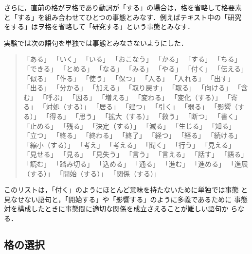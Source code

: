 \documentclass[japanese]{jnlp_1.4}
\begin{document}
さらに，直前の格がヲ格であり動詞が「する」の場合は，格を省略して格要素
と「する」を組み合わせてひとつの事態とみなす．例えばテキスト中の「研究
をする」はヲ格を省略して「研究する」という事態とみなす．

実験では次の語句を単独では事態とみなさないようにした．

\begin{quotation}
「ある」
「いく」
「いる」
「おこなう」
「かる」
「する」
「ちる」
「できる」
「とめる」
「なる」
「みる」
「やる」
「付く」
「伝える」
「似る」
「作る」
「使う」
「保つ」
「入る」
「入れる」
「出す」
「出る」
「分かる」
「加える」
「取り戻す」
「取る」
「向ける」
「含む」
「呼ぶ」
「因る」
「増える」
「変わる」
「変化（する）」
「寄る」
「対処（する）」
「居る」
「建つ」
「引く」
「弱る」
「影響（する）」
「得る」
「思う」
「拡大（する）」
「救う」
「断つ」
「書く」
「止める」
「残る」
「決定（する）」
「減る」
「生じる」
「知る」
「立つ」
「終る」
「終わる」
「終了」
「経つ」
「経る」
「続ける」
「縮小（する）」
「考え」
「考える」
「聞く」
「行う」
「見える」
「見せる」
「見る」
「見失う」
「言う」
「言える」
「話す」
「語る」
「読む」
「踏み切る」
「込める」
「通る」
「進む」
「進める」
「進展（する）」
「開始（する）」
「関係（する）」
\end{quotation}

このリストは，「付く」のようにほとんど意味を持たないために単独では事態
と見なせない語句と，「開始する」や「影響する」のように多義であるために
事態対を構成したときに事態間に適切な関係を成立さえることが難しい語句か
らなる．


\subsection{格の選択}
\label{ssec:argument_selection}
\end{document}
